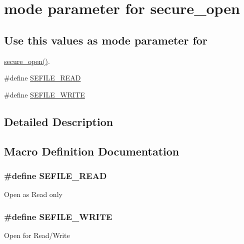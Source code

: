 \hypertarget{group__mode}{\section{mode parameter for secure\-\_\-open}
\label{group__mode}
}
\subsection*{Use this values as mode parameter for}
\label{_amgrpd5b5de603422234112c95d28a5b084e8}%
\hyperlink{_s_efile_8c_ae99f8ccb396cbb5685d9e16bb3dbbe98}{secure\-\_\-open()}. \begin{DoxyCompactItemize}
\item 
\#define \hyperlink{group__mode_ga54f7b08eaa281b5cc96f9b38f8cec756}{S\-E\-F\-I\-L\-E\-\_\-\-R\-E\-A\-D}
\item 
\#define \hyperlink{group__mode_ga3402f85400c41104d35136c74566cf67}{S\-E\-F\-I\-L\-E\-\_\-\-W\-R\-I\-T\-E}
\end{DoxyCompactItemize}


\subsection{Detailed Description}


\subsection{Macro Definition Documentation}
\hypertarget{group__mode_ga54f7b08eaa281b5cc96f9b38f8cec756}{
\subsubsection[{S\-E\-F\-I\-L\-E\-\_\-\-R\-E\-A\-D}]{\setlength{\rightskip}{0pt plus 5cm}\#define S\-E\-F\-I\-L\-E\-\_\-\-R\-E\-A\-D}}\label{group__mode_ga54f7b08eaa281b5cc96f9b38f8cec756}
Open as Read only \hypertarget{group__mode_ga3402f85400c41104d35136c74566cf67}{
\subsubsection[{S\-E\-F\-I\-L\-E\-\_\-\-W\-R\-I\-T\-E}]{\setlength{\rightskip}{0pt plus 5cm}\#define S\-E\-F\-I\-L\-E\-\_\-\-W\-R\-I\-T\-E}}\label{group__mode_ga3402f85400c41104d35136c74566cf67}
Open for Read/\-Write 
